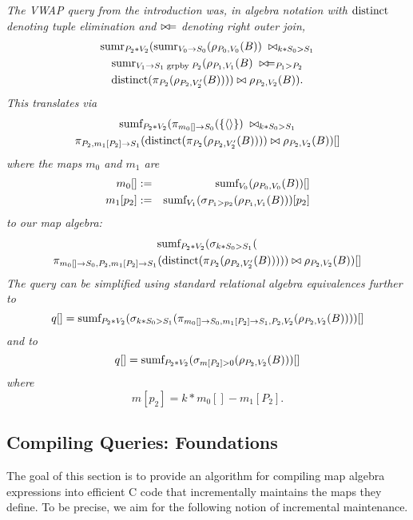 \begin{example}\em
The VWAP query from the introduction was, in algebra notation with $\mbox{distinct}$
denoting
tuple elimination and $\bowtie\!=$ denoting right outer join,
\begin{multline*}
\mbox{sumr}_{P_2 * V_2}(\mbox{sumr}_{V_0 \rightarrow S_0}(\rho_{P_0, V_0}(B))
\; \bowtie_{k * S_0 > S_1} \\
\mbox{sumr}_{V_1 \rightarrow S_1 \;\mathrm{grpby}\; P_2}(
\rho_{P_1, V_1}(B) \; \bowtie\!=_{P_1 > P_2} \\
\mbox{distinct}(\pi_{P_2}(\rho_{P_2, V_2'}(B)))) \bowtie \rho_{P_2, V_2}(B)).
\end{multline*}
This translates via 
\begin{multline*}
\mbox{sumf}_{P_2 * V_2}(
\pi_{m_0[]  \rightarrow S_0}(\{{\langle\rangle}\})
\; \bowtie_{k * S_0 > S_1} \\
\pi_{P_2, m_1[P_2] \rightarrow S_1}
(\mbox{distinct}(\pi_{P_2}(\rho_{P_2, V_2'}(B)))) \bowtie \rho_{P_2, V_2}(B))[]
\end{multline*}
%
where the maps $m_0$ and $m_1$ are
\begin{eqnarray*}
m_0[] &:=&
\mbox{sumf}_{V_0}(\rho_{P_0, V_0}(B))[]
\\
m_1[p_2] &:=&
\mbox{sumf}_{V_1}(\sigma_{P_1 > p_2}(\rho_{P_1, V_1}(B)))[p_2]
\end{eqnarray*}
to our map algebra:
\begin{multline*}
\mbox{sumf}_{P_2 * V_2}(
\sigma_{k * S_0 > S_1}( \\
\pi_{m_0[]  \rightarrow S_0, P_2, m_1[P_2] \rightarrow S_1}
(\mbox{distinct}(\pi_{P_2}(\rho_{P_2, V_2'}(B))))) \bowtie \rho_{P_2, V_2}(B))[]
\end{multline*}
The query can be simplified using standard relational algebra equivalences
further to
\[
q[] = \mbox{sumf}_{P_2 * V_2}(
\sigma_{k * S_0 > S_1}(
\pi_{m_0[]  \rightarrow S_0, m_1[P_2] \rightarrow S_1, P_2, V_2}
(\rho_{P_2, V_2}(B))))[]
\]
and to
\begin{equation}
q[] = \mbox{sumf}_{P_2 * V_2}(
\sigma_{m[P_2] > 0}(\rho_{P_2, V_2}(B)))[]
\end{equation}
where
\[
m[p_2] = k * m_0[] - m_1[P_2].
\]
\punto
\end{example}



\subsection{Compiling Queries: Foundations}


The goal of this section is to provide an algorithm for compiling map algebra
expressions into efficient C code that incrementally maintains the
maps they define.
To be precise, we aim for the following notion of incremental maintenance.


